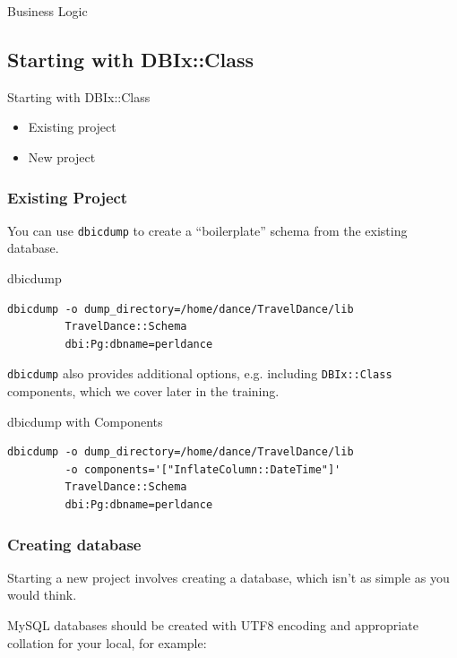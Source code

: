 \begin{frame}{Business Logic}
\end{frame}

\subsection{Starting with DBIx::Class}

\begin{frame}{Starting with DBIx::Class}
\begin{itemize}
\item Existing project
\item New project
\end{itemize}
\end{frame}

\subsubsection{Existing Project}

You can use \verb|dbicdump| to create a ``boilerplate'' schema from the
existing database.

\begin{frame}[fragile]{dbicdump}
\begin{lstlisting}
dbicdump -o dump_directory=/home/dance/TravelDance/lib 
         TravelDance::Schema 
         dbi:Pg:dbname=perldance
\end{lstlisting}
\end{frame}

\verb|dbicdump| also provides additional options, e.g.
including \verb|DBIx::Class| components, which we cover
later in the training.

\begin{frame}[fragile]{dbicdump with Components}
\begin{lstlisting}
dbicdump -o dump_directory=/home/dance/TravelDance/lib 
         -o components='["InflateColumn::DateTime"]'
         TravelDance::Schema 
         dbi:Pg:dbname=perldance
\end{lstlisting}
\end{frame}

\subsubsection{Creating database}
Starting a new project involves creating a database, which
isn't as simple as you would think.

MySQL databases should be created with UTF8 encoding and appropriate 
collation for your local, for example:

